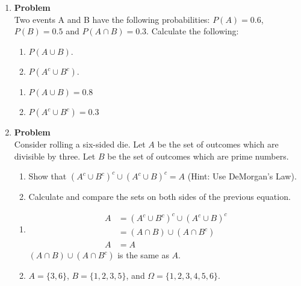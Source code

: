 \documentclass[12pt]{article}
\newenvironment{Ex}{\textbf{Problem}\vspace{.75em}\\}{}
\begin{document}
\begin{enumerate}
\begin{Ex}
    following:
    \begin{enumerate}
    \item $P(A \cup C)$.
    \item $P(B^c \cap D^c)$.
    \end{enumerate}
    \begin{solution} \hfill
      \begin{enumerate}
      \item $P(A \cup C) = \frac{52}{60} = 0.8667$
      \item $P(B^c \cap D^c) = \frac{24}{60} = 0.4$
      \end{enumerate}
    \end{solution}
  \end{Ex}
\item 
  \begin{Ex}
    Two events A and B have the following probabilities: $P(A) = 0.6$,
    $P(B) = 0.5$ and $P(A \cap B) = 0.3$. Calculate the following:
    \begin{enumerate}
    \item $P(A \cup B)$.
    \item $P(A^c \cup B^c)$.
    \end{enumerate}
    \begin{solution} \hfill
      \begin{enumerate}
      \item $P(A \cup B) = 0.8$
      \item $P(A^c \cup B^c) = 0.3$
      \end{enumerate}
    \end{solution}
  \end{Ex}
\item 
  \begin{Ex}
    Consider rolling a six-sided die. Let $A$ be the set of outcomes
    which are divisible by three. Let $B$ be the set of outcomes which
    are prime numbers.
    \begin{enumerate}
    \item Show that $(A^c \cup B^c)^c \cup (A^c \cup B)^c=A$ (Hint:
      Use DeMorgan's Law).
    \item Calculate and compare the sets on both sides of the previous
      equation.
    \end{enumerate}
    \begin{solution} \hfill
      \begin{enumerate}
      \item
        \begin{equation*}
          \begin{aligned}
             A &= (A^c \cup B^c)^c \cup (A^c \cup B)^c \\
             &= (A \cap B) \cup (A \cap B^c) \\
             A &= A
          \end{aligned}
        \end{equation*}
        $(A \cap B) \cup (A \cap B^c)$ is the same as $A$.
      \item $A = \{3,6\}$, $B = \{1,2,3,5\}$, and $\Omega = \{1,2,3,4,5,6\}$.


\end{enumerate}
\end{solution}
\end{Ex}
\end{enumerate}
\end{document}
